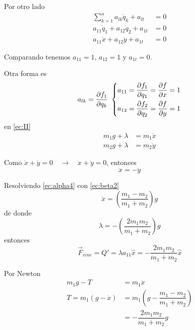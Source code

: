 \documentclass[../main]{subfiles}
\begin{document}
Por otro lado
\begin{align*}
    \sum_{k=1}^n a_{lk}\dot{q}_k+a_{lt}&=0 \\
    a_{11}\dot{q}_1+a_{12}\dot{q}_2+a_{1t}&=0 \\
    a_{11}\dot{x}+a_{12}\dot{y}+a_{1t}&=0
\end{align*}

Comparando tenemos $a_{11}=1$, $a_{12}=1$ y $a_{1t}=0$. 

Otra forma es
\begin{equation}
    a_{lk}=\pdv{f_1}{q_k} \
    \left\{
    \begin{split}
        a_{11}&=\pdv{f_1}{q_1}=\pdv{f}{x}=1\\
        a_{12}&=\pdv{f_2}{q_2}=\pdv{f}{y}=1
    \end{split}
    \right.
\end{equation}
en \eqref{ec:II}
\begin{equation}\tag{$\alpha$}
    \begin{split}
        m_1 g+\lambda&=m_1 \ddot{x}\\
        m_2 g+\lambda&=m_2 \ddot{y}
    \end{split}
    \label{ec:alpha4}
\end{equation}

Como $\dot{x}+\dot{y}=0 \quad \rightarrow \quad \ddot{x}+\ddot{y}=0$, entonces 
\begin{equation}\tag{$\beta$}
    \ddot{x}=-\ddot{y}
    \label{ec:beta2}
\end{equation}

Resolviendo \eqref{ec:alpha4} con \eqref{ec:beta2}
\begin{equation}
    \ddot{x}=\left(\dfrac{m_1-m_2}{m_1+m_2}\right)g
\end{equation}
de donde
\begin{equation}
    \lambda=-\left(\dfrac{2m_1 m_2}{m_1+m_2}\right)g
\end{equation}
entonces
\begin{equation}
    \vec{F}_{vinc}=Q'=\lambda a_{11}\hat{x}=-\dfrac{2m_1 m_2}{m_1+m_2}\hat{x}
\end{equation}

Por Newton
\begin{align*}
    m_1 g-T&=m_1 \ddot{x} \\
    T=m_1(g-\ddot{x})&=m_1\left(g-\dfrac{m_1-m_2}{m_1+m_2}\right)\\
    &=-\dfrac{2m_1m_2}{m_1+m_2}g
\end{align*}
\end{document}

